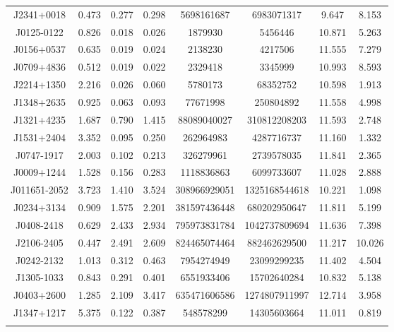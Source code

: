 \begin{table}
\begin{tabular}{cccccccc}
     J2341+0018 & 0.473 & 0.277 & 0.298  & 5698161687 & 6983071317  & 9.647 & 8.153  \\
    \addlinespace
      J0125-0122 & 0.826 & 0.018 & 0.026  & 1879930 & 5456446  & 10.871 & 5.263 \\
    \addlinespace
    J0156+0537 & 0.635 & 0.019 & 0.024  & 2138230 & 4217506  & 11.555 & 7.279   \\
    \addlinespace
    J0709+4836 & 0.512 & 0.019 & 0.022  & 2329418 & 3345999  & 10.993 & 8.593\\
    \addlinespace
    J2214+1350 & 2.216 & 0.026 & 0.060  & 5780173 & 68352752  & 10.598 & 1.913  \\
    \addlinespace
    J1348+2635 & 0.925 & 0.063 & 0.093  & 77671998 & 250804892  & 11.558 & 4.998 \\
    \addlinespace
     J1321+4235 & 1.687 & 0.790 & 1.415  & 88089040027 & 310812208203  & 11.593 & 2.748 \\
    \addlinespace
    J1531+2404 & 3.352 & 0.095 & 0.250  & 262964983 & 4287716737  & 11.160 & 1.332  \\
    \addlinespace
    J0747-1917 & 2.003 & 0.102 & 0.213  & 326279961 & 2739578035  & 11.841 & 2.365 \\
    \addlinespace
    J0009+1244 & 1.528 & 0.156 & 0.283  & 1118836863 & 6099733607  & 11.028 & 2.888  \\
    \addlinespace
    J011651-2052 & 3.723 & 1.410 & 3.524  & 308966929051 & 1325168544618  & 10.221 & 1.098  \\
    \addlinespace
    J0234+3134 & 0.909 & 1.575 & 2.201  & 381597436448 & 680202950647  & 11.811 & 5.199  \\
    \addlinespace
    J0408-2418 & 0.629 & 2.433 & 2.934  & 795973831784 & 1042737809694  & 11.636 & 7.398  \\
    \addlinespace
    J2106-2405 & 0.447 & 2.491 & 2.609  & 824465074464 & 882462629500  & 11.217 & 10.026 \\
    \addlinespace 
    J0242-2132 & 1.013 & 0.312 & 0.463  & 7954274949 & 23099299235  & 11.402 & 4.504  \\
    \addlinespace 
    J1305-1033 & 0.843 & 0.291 & 0.401  & 6551933406 & 15702640284  & 10.832 & 5.138  \\
    \addlinespace 
    J0403+2600 & 1.285 & 2.109 & 3.417  & 635471606586 & 1274807911997  & 12.714 & 3.958  \\
    \addlinespace
    J1347+1217 & 5.375 & 0.122 & 0.387  & 548578299 & 14305603664  & 11.011 & 0.819  \\
    \addlinespace
\end{tabular}  
\end{table}
